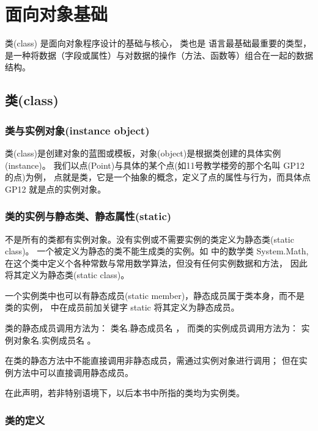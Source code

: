 
\chapter{\cs 面向对象基础}

类(class) 是面向对象程序设计的基础与核心，
类也是 \cs 语言最基础最重要的类型，是一种将数据（字段或属性）与对数据的操作（方法、函数等）组合在一起的数据结构。


\section{类(class)}

\subsection{类与实例对象(instance object)}

类(class)是创建对象的蓝图或模板，对象(object)是根据类创建的具体实例(instance)。
我们以点(Point)与具体的某个点(如11号教学楼旁的那个名叫 GP12 的点)为例，
点就是类，它是一个抽象的概念，定义了点的属性与行为，而具体点 GP12 就是点的实例对象。




\subsection{类的实例与静态类、静态属性(static)}

不是所有的类都有实例对象。没有实例或不需要实例的类定义为静态类(static class)。
一个被定义为静态的类不能生成类的实例。如 \cs 中的数学类 System.Math,
在这个类中定义个各种常数与常用数学算法，但没有任何实例数据和方法，
因此将其定义为静态类(static class)。

一个实例类中也可以有静态成员(static member)，静态成员属于类本身，而不是类的实例，
\cs 中在成员前加关键字 static 将其定义为静态成员。

类的静态成员调用方法为： 类名.静态成员名 ，
而类的实例成员调用方法为： 实例对象名.实例成员名 。

在类的静态方法中不能直接调用非静态成员，需通过实例对象进行调用；
但在实例方法中可以直接调用静态成员。

在此声明，若非特别语境下，以后本书中所指的类均为实例类。


\subsection{类的定义}

